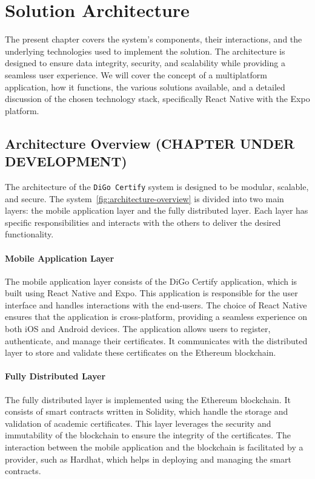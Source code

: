 %
%
\chapter{Solution Architecture}\label{chap:architecture}

The present chapter covers the system's components, their interactions, and the underlying technologies used to implement the solution. The architecture is designed to ensure data integrity, security, and scalability while providing a seamless user experience. We will cover the concept of a multiplatform application, how it functions, the various solutions available, and a detailed discussion of the chosen technology stack, specifically React Native with the Expo\cite{Expo} platform.

\section{Architecture Overview (CHAPTER UNDER DEVELOPMENT)}\label{sec:architecture-overview}

The architecture of the \texttt{DiGo Certify} system is designed to be modular, scalable, and secure. The system~\ref{fig:architecture-overview} is divided into two main layers: the mobile application layer and the fully distributed layer. Each layer has specific responsibilities and interacts with the others to deliver the desired functionality.

\subsubsection{Mobile Application Layer}

The mobile application layer consists of the DiGo Certify application, which is built using React Native and Expo. This application is responsible for the user interface and handles interactions with the end-users. The choice of React Native ensures that the application is cross-platform, providing a seamless experience on both iOS and Android devices. The application allows users to register, authenticate, and manage their certificates. It communicates with the distributed layer to store and validate these certificates on the Ethereum blockchain.

\subsubsection{Fully Distributed Layer}

The fully distributed layer is implemented using the Ethereum blockchain. It consists of smart contracts written in Solidity, which handle the storage and validation of academic certificates. This layer leverages the security and immutability of the blockchain to ensure the integrity of the certificates. The interaction between the mobile application and the blockchain is facilitated by a provider, such as Hardhat, which helps in deploying and managing the smart contracts.


